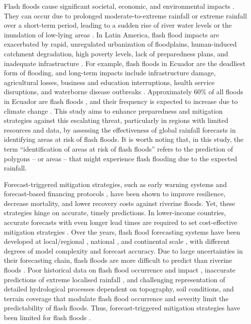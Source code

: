 \documentclass[techmemo]{ecmwfrep}%
\begin{document}
Flash floods cause significant societal, economic, and environmental impacts \citep{Dordevic2020, Jonkman2008a}. They can occur due to prolonged moderate-to-extreme rainfall or extreme rainfall over a short-term period, leading to a sudden rise of river water levels or the inundation of low-lying areas \citep{Speight2021, Zanchetta2020}. In Latin America, flash flood impacts are exacerbated by rapid, unregulated urbanization of floodplains, human-induced catchment degradation, high poverty levels, lack of preparedness plans, and inadequate infrastructure \citep{Pinos2022}. For example, flash floods in Ecuador are the deadliest form of flooding, and long-term impacts include infrastructure damage, agricultural losses, business and education interruptions, health service disruptions, and waterborne disease outbreaks \citep{Galarza-Villamar2018}. Approximately 60\% of all floods in Ecuador are flash floods \citep{Kruczkiewicz2021a}, and their frequency is expected to increase due to climate change \citep{Hirabayashi2021}. This study aims to enhance preparedness and mitigation strategies against this escalating threat, particularly in regions with limited resources and data, by assessing the effectiveness of global rainfall forecasts in identifying areas at risk of flash floods. It is worth noting that, in this study, the term “identification of areas at risk of flash floods” refers to the prediction of polygons – or areas – that might experience flash flooding due to the expected rainfall. 

Forecast-triggered mitigation strategies, such as early warning systems \citep{Coughlan2022, Sakic2022} and forecast-based financing protocols \citep{Bischiniotis2019, DePerez2016}, have been shown to improve resilience, decrease mortality, and lower recovery costs against riverine floods. Yet, these strategies hinge on accurate, timely predictions. In lower-income countries, accurate forecasts with even longer lead times are required to set cost-effective mitigation strategies \citep{Bazo2019, Kiptum2023}. Over the years, flash flood forecasting systems have been developed at local/regional \citep{Corral2019, Ibarreche2020, RamosFilho2021, Shuvo2021, Speight2018}, national \citep{Javelle2016, Liu2018a}, and continental scale \citep{Gourley2017, Raynaud2015}, with different degrees of model complexity and forecast accuracy. Due to large uncertainties in their forecasting chain, flash floods are more difficult to predict than riverine floods \citep{Speight2021, Zanchetta2020}. Poor historical data on flash flood occurrence and impact \citep{Lowrie2022}, inaccurate predictions of extreme localised rainfall \citep{Zeman2021}, and challenging representation of detailed hydrological processes dependent on topography, soil conditions, and terrain coverage that modulate flash flood occurrence and severity \citep{Xing2019} limit the predictability of flash floods. Thus, forecast-triggered mitigation strategies have been limited for flash floods \citep{DePerez2016}.
\end{document}
